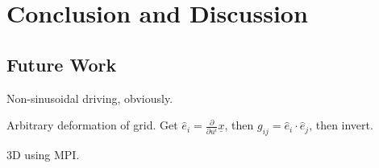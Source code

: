 
\chapter{Conclusion and Discussion}
\label{conclusion_chapter}



\section{Future Work}

Non-sinusoidal driving, obviously. 

Arbitrary deformation of grid. Get $\hat{e}_i = \frac{\partial}{\partial u^i} \underline{x}$, then $g_{ij} = \hat{e}_i \cdot \hat{e}_j$, then invert. 

3D using MPI. 

